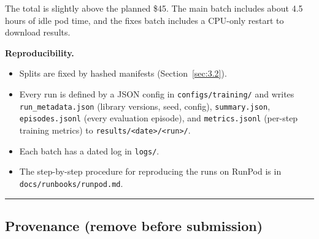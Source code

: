 The total is slightly above the planned \$45. The main batch includes
about 4.5 hours of idle pod time, and the fixes batch includes a
CPU-only restart to download results.

\textbf{Reproducibility.}

\begin{itemize}
\tightlist
\item
  Splits are fixed by hashed manifests (Section~\ref{sec:3.2}).
\item
  Every run is defined by a JSON config in
  \texttt{configs/\allowbreak{}training/\allowbreak{}} and writes
  \texttt{run\_\allowbreak{}metadata.\allowbreak{}json} (library
  versions, seed, config), \texttt{summary.\allowbreak{}json},
  \texttt{episodes.\allowbreak{}jsonl} (every evaluation episode), and
  \texttt{metrics.\allowbreak{}jsonl} (per-step training metrics) to
  \texttt{results/\allowbreak{}<date>/\allowbreak{}<run>/\allowbreak{}}.
\item
  Each batch has a dated log in \texttt{logs/\allowbreak{}}.
\item
  The step-by-step procedure for reproducing the runs on RunPod is in
  \texttt{docs/\allowbreak{}runbooks/\allowbreak{}runpod.\allowbreak{}md}.
\end{itemize}

\begin{center}\rule{0.5\linewidth}{0.5pt}\end{center}

\subsection{Provenance (remove before
submission)}\label{provenance-remove-before-submission}

